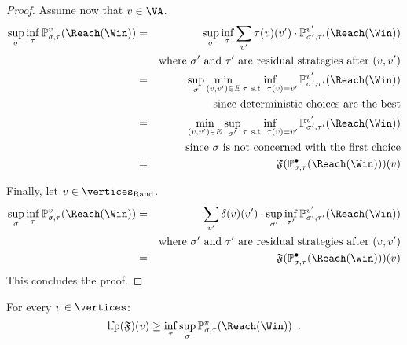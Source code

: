 \begin{proof}
Assume now that $v \in \VA$. 
\begin{eqnarray*}
\sup_\sigma \inf_\tau \probm_{\sigma,\tau}^v(\Reach(\Win)) & = &
\sup_\sigma \inf_\tau \sum_{v'} \tau(v)(v')
\cdot \probm_{\sigma',\tau'}^{v'}(\Reach(\Win)) \\
& & \text{where}\ \sigma'\ \text{and}\ \tau'\ \text{are residual
strategies after}\ (v,v') \\
& = & \sup_\sigma \min_{(v,v') \in E} \inf_{\tau\
\text{s.t.}\ \tau(v) = v'} 
\probm_{\sigma',\tau'}^{v'}(\Reach(\Win)) \\
& & \text{since deterministic choices are the best} \\
& = & \min_{(v,v') \in E}  \sup_{\sigma'} \inf_{\tau\
\text{s.t.}\ \tau(v) = v'} \probm_{\sigma',\tau'}^{v'}(\Reach(\Win)) \\
& & \text{since}\ \sigma\ \text{is not concerned with the first
choice} \\
& = & \mathfrak{F}(\probm_{\sigma,\tau}^{\bullet}(\Reach(\Win)))(v)
\end{eqnarray*}

Finally, let  $v \in \Randomvertices$. 
\begin{eqnarray*}
\sup_\sigma \inf_\tau \probm_{\sigma,\tau}^v(\Reach(\Win)) & = & \sum_{v'} \delta(v)(v') \cdot \sup_{\sigma'} \inf_{\tau'} \probm_{\sigma',\tau'}^{v'}(\Reach(\Win))\\
& & \text{where}\ \sigma'\ \text{and}\ \tau'\ \text{are residual
strategies after}\ (v,v') \\
& = & \mathfrak{F}(\probm_{\sigma,\tau}^{\bullet}(\Reach(\Win)))(v)
\end{eqnarray*}
This concludes the proof.
  
\end{proof}

\begin{lemma}
\label{6-lem:lfpleval}
For every $v \in \vertices$:
\[
\lfp(\mathfrak{F})(v) \ge \inf_\tau \sup_\sigma
\probm_{\sigma,\tau}^v(\Reach(\Win)) \enspace.
\]
\end{lemma}

